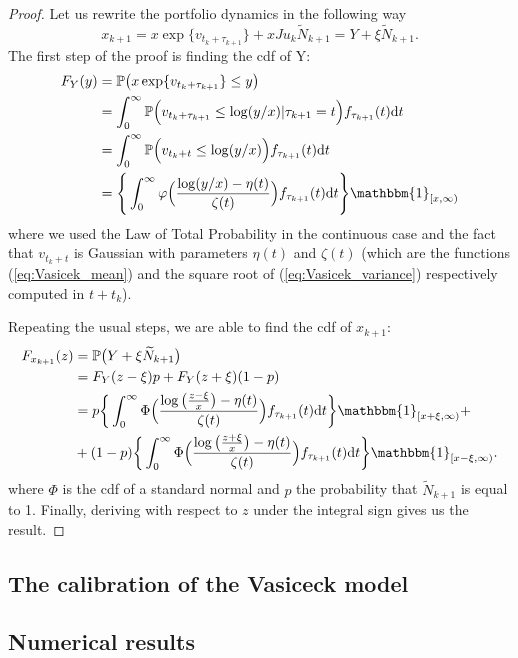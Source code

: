 \begin{proof}
	Let us rewrite the portfolio dynamics in the following way
	\[
	x_{k+1}=x\exp\{v_{t_k+\tau_{k+1}}\} + xJu_k\widetilde{N}_{k+1}=Y+\xi\widetilde{N}_{k+1}.
	\]
	The first step of the proof is finding the cdf of Y:
	\begin{align*}
	F_Y(y) & = \mathbb{P}\big(x\exp\{v_{t_k+\tau_{k+1}}\}\leq y\big)\\
	& = \int_{0}^{\infty}\mathbb{P}\Big(v_{t_k+\tau_{k+1}}\leq \log(y/x)\lvert \tau_{k+1}=t\Big)f_{\tau_{k+1}}(t)\mathrm{d}t\\
	& = \int_{0}^{\infty}\mathbb{P}\Big(v_{t_k+t}\leq \log(y/x)\Big)f_{\tau_{k+1}}(t)\mathrm{d}t\\
	& = \Bigg\{\int_{0}^{\infty}\varphi\Big(\frac{\log(y/x)-\eta(t)}{\zeta(t)}\Big)f_{\tau_{k+1}}(t)\mathrm{d}t \Bigg\}\mathbbm{1}_{[x,\infty)}
	\end{align*}
	where we used the Law of Total Probability in the continuous case and the fact that $v_{t_k+t}$ is Gaussian with parameters $\eta(t)$ and $\zeta(t)$ (which are the functions (\ref{eq:Vasicek_mean}) and the square root of (\ref{eq:Vasicek_variance}) respectively computed in $t+t_k$).
	
	
Repeating the usual steps, we are able to find the cdf of $x_{k+1}$:
\begin{align*}
F_{x_{k+1}}(z) & = \mathbb{P}\big(Y+\xi\widetilde{N}_{k+1}\big) \\
& = F_Y(z-\xi)p+F_Y(z+\xi)(1-p)\\
& = p\bigg\{ \int_{0}^{\infty}\Phi\Big(\frac{\log\big(\frac{z-\xi}{x}\big)-\eta(t)}{\zeta(t)}\Big)f_{\tau_{k+1}}(t)\mathrm{d}t\bigg\}\mathbbm{1}_{[x+\xi,\infty)}+\\
& + (1-p)\bigg\{ \int_{0}^{\infty}\Phi\Big(\frac{\log\big(\frac{z+\xi}{x}\big)-\eta(t)}{\zeta(t)}\Big)f_{\tau_{k+1}}(t)\mathrm{d}t\bigg\}\mathbbm{1}_{[x-\xi,\infty)}.
\end{align*}
where $\Phi$ is the cdf of a standard normal and $p$ the probability that $\widetilde{N}_{k+1}$ is equal to 1. Finally, deriving with respect to $z$ under the integral sign gives us the result.
\end{proof}
\subsection{The calibration of the Vasiceck model}
\subsection{Numerical results}



